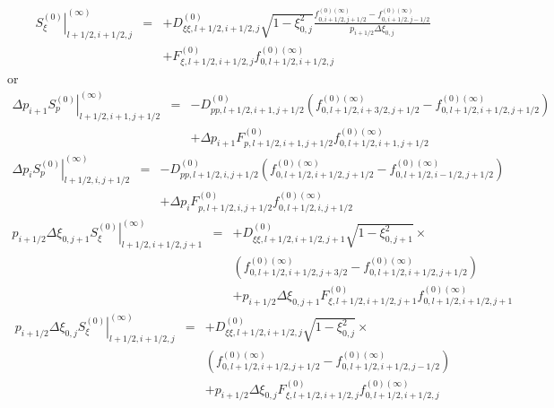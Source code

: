 \begin{eqnarray}
\left. S_{\xi }^{\left( 0\right) }\right| _{l+1/2,i+1/2,j}^{(\infty )}
&=&+D_{\xi \xi ,l+1/2,i+1/2,j}^{\left( 0\right) }\sqrt{1-\xi _{0,j}^{2}}%
\frac{f_{0,i+1/2,j+1/2}^{\left( 0\right) (\infty
)}-f_{0,i+1/2,j-1/2}^{\left( 0\right) (\infty )}}{p_{i+1/2}\Delta \xi _{0,j}}
\nonumber \\
&&+F_{\xi ,l+1/2,i+1/2,j}^{\left( 0\right) }f_{0,l+1/2,i+1/2,j}^{\left(
0\right) (\infty )}
\end{eqnarray}
or
\begin{eqnarray}
\Delta p_{i+1}\left. S_{p}^{\left( 0\right) }\right|
_{l+1/2,i+1,j+1/2}^{(\infty )} &=&-D_{pp,l+1/2,i+1,j+1/2}^{\left( 0\right)
}\left( f_{0,l+1/2,i+3/2,j+1/2}^{\left( 0\right) (\infty
)}-f_{0,l+1/2,i+1/2,j+1/2}^{\left( 0\right) (\infty )}\right)  \nonumber \\
&&+\Delta p_{i+1}F_{p,l+1/2,i+1,j+1/2}^{\left( 0\right)
}f_{0,l+1/2,i+1,j+1/2}^{\left( 0\right) (\infty )}
\end{eqnarray}
\begin{eqnarray}
\Delta p_{i}\left. S_{p}^{\left( 0\right) }\right| _{l+1/2,i,j+1/2}^{(\infty
)} &=&-D_{pp,l+1/2,i,j+1/2}^{\left( 0\right) }\left(
f_{0,l+1/2,i+1/2,j+1/2}^{\left( 0\right) (\infty
)}-f_{0,l+1/2,i-1/2,j+1/2}^{\left( 0\right) (\infty )}\right)  \nonumber \\
&&+\Delta p_{i}F_{p,l+1/2,i,j+1/2}^{\left( 0\right)
}f_{0,l+1/2,i,j+1/2}^{\left( 0\right) (\infty )}
\end{eqnarray}
\begin{eqnarray}
p_{i+1/2}\Delta \xi _{0,j+1}\left. S_{\xi }^{\left( 0\right) }\right|
_{l+1/2,i+1/2,j+1}^{(\infty )} &=&+D_{\xi \xi ,l+1/2,i+1/2,j+1}^{\left(
0\right) }\sqrt{1-\xi _{0,j+1}^{2}}\times  \nonumber \\
&&\left( f_{0,l+1/2,i+1/2,j+3/2}^{\left( 0\right) (\infty
)}-f_{0,l+1/2,i+1/2,j+1/2}^{\left( 0\right) (\infty )}\right)  \nonumber \\
&&+p_{i+1/2}\Delta \xi _{0,j+1}F_{\xi ,l+1/2,i+1/2,j+1}^{\left( 0\right)
}f_{0,l+1/2,i+1/2,j+1}^{\left( 0\right) (\infty )}
\end{eqnarray}
\begin{eqnarray}
p_{i+1/2}\Delta \xi _{0,j}\left. S_{\xi }^{\left( 0\right) }\right|
_{l+1/2,i+1/2,j}^{(\infty )} &=&+D_{\xi \xi ,l+1/2,i+1/2,j}^{\left( 0\right)
}\sqrt{1-\xi _{0,j}^{2}}\times  \nonumber \\
&&\left( f_{0,l+1/2,i+1/2,j+1/2}^{\left( 0\right) (\infty
)}-f_{0,l+1/2,i+1/2,j-1/2}^{\left( 0\right) (\infty )}\right)  \nonumber \\
&&+p_{i+1/2}\Delta \xi _{0,j}F_{\xi ,l+1/2,i+1/2,j}^{\left( 0\right)
}f_{0,l+1/2,i+1/2,j}^{\left( 0\right) (\infty )}
\end{eqnarray}

